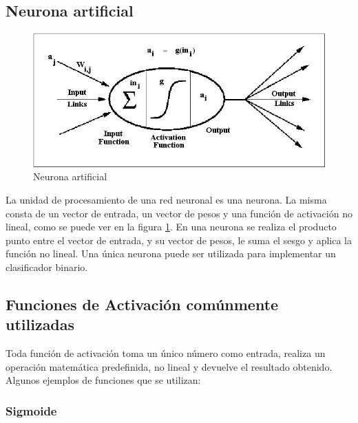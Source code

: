 \documentclass[a4paper,11pt,spanish]{book}
\begin{document}
      \subsection {Neurona artificial}
	\begin{figure}[H]
          \begin{center}
            \includegraphics[width=0.4\linewidth]{./img/neuron.jpg}
	  \caption{Neurona artificial \label{fig:neuron}}
          \end{center}
	\end{figure}
	La unidad de procesamiento de una red neuronal es una neurona. La misma consta de un vector de entrada, un vector de pesos y una función de activación no lineal,
	como se puede ver en la figura \ref{fig:neuron}.
	En una neurona se realiza el producto punto entre el vector de entrada, y su vector de pesos, le suma el sesgo y aplica la función no lineal.
	Una única neurona puede ser utilizada para implementar un clasificador binario.


      \subsection {Funciones de Activación comúnmente utilizadas}
	Toda función de activación toma un único número como entrada, realiza un operación matemática predefinida, no lineal y devuelve el resultado obtenido.
	Algunos ejemplos de funciones que se utilizan:
	  \subsubsection {Sigmoide}
\end{document}
